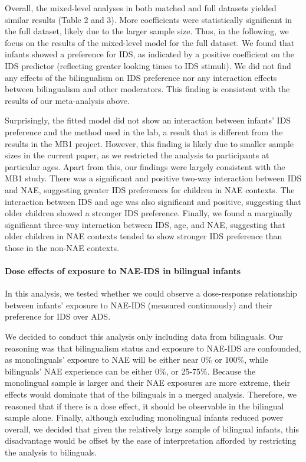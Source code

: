 \documentclass[english,,man,floatsintext]{apa6}
\begin{document}
Overall, the mixed-level analyses in both matched and full datasets yielded similar results (Table 2 and 3). More coefficients were statistically significant in the full dataset, likely due to the larger sample size. Thus, in the following, we focus on the results of the mixed-level model for the full dataset. We found that infants showed a preference for IDS, as indicated by a positive coefficient on the IDS predictor (reflecting greater looking times to IDS stimuli). We did not find any effects of the bilingualism on IDS preference nor any interaction effects between bilingualism and other moderators. This finding is consistent with the results of our meta-analysis above.

Surprisingly, the fitted model did not show an interaction between infants' IDS preference and the method used in the lab, a result that is different from the results in the MB1 project. However, this finding is likely due to smaller sample sizes in the current paper, as we restricted the analysis to participants at particular ages. Apart from this, our findings were largely consistent with the MB1 study. There was a significant and positive two-way interaction between IDS and NAE, suggesting greater IDS preferences for children in NAE contexts. The interaction between IDS and age was also significant and positive, suggesting that older children showed a stronger IDS preference. Finally, we found a marginally significant three-way interaction between IDS, age, and NAE, suggesting that older children in NAE contexts tended to show stronger IDS preference than those in the non-NAE contexts.

\hypertarget{dose-effects-of-exposure-to-nae-ids-in-bilingual-infants}{%
\paragraph{Dose effects of exposure to NAE-IDS in bilingual infants}\label{dose-effects-of-exposure-to-nae-ids-in-bilingual-infants}}

In this analysis, we tested whether we could observe a dose-response relationship between infants' exposure to NAE-IDS (measured continuously) and their preference for IDS over ADS.

We decided to conduct this analysis only including data from bilinguals. Our reasoning was that bilingualism status and exposure to NAE-IDS are confounded, as monolinguals' exposure to NAE will be either near 0\% or 100\%, while bilinguals' NAE experience can be either 0\%, or 25-75\%. Because the monolingual sample is larger and their NAE exposures are more extreme, their effects would dominate that of the bilinguals in a merged analysis. Therefore, we reasoned that if there is a dose effect, it should be observable in the bilingual sample alone. Finally, although excluding monolingual infants reduced power overall, we decided that given the relatively large sample of bilingual infants, this disadvantage would be offset by the ease of interpretation afforded by restricting the analysis to bilinguals.
\end{document}
